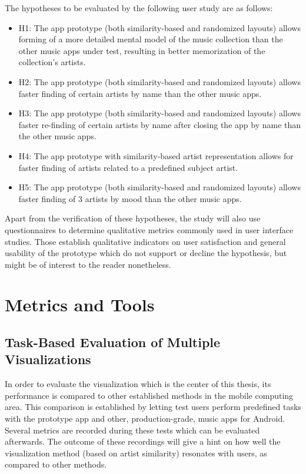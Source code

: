 The hypotheses to be evaluated by the following user study are as follows:

\begin{itemize}
	\item H1: The app prototype (both similarity-based and randomized layouts) allows forming of a more detailed mental model of the music collection than the other music apps under test, resulting in better memorization of the collection's artists.
	\item H2: The app prototype (both similarity-based and randomized layouts) allows faster finding of certain artists by name than the other music apps.
	\item H3: The app prototype (both similarity-based and randomized layouts) allows faster re-finding of certain artists by name after closing the app by name than the other music apps.
	\item H4: The app prototype with similarity-based artist representation allows for faster finding of artists related to a predefined subject artist.
	\item H5: The app prototype (both similarity-based and randomized layouts) allows faster finding of 3 artists by mood than the other music apps.
\end{itemize}

Apart from the verification of these hypotheses, the study will also use questionnaires to determine qualitative metrics commonly used in user interface studies. Those establish qualitative indicators on user satisfaction and general usability of the prototype which do not support or decline the hypothesis, but might be of interest to the reader nonetheless.

\section{Metrics and Tools}

\subsection{Task-Based Evaluation of Multiple Visualizations}

In order to evaluate the visualization which is the center of this thesis, its performance is compared to other established methods in the mobile computing area. This comparison is established by letting test users perform predefined tasks with the prototype app and other, production-grade, music apps for Android. Several metrics are recorded during these tests which can be evaluated afterwards. The outcome of these recordings will give a hint on how well the visualization method (based on artist similarity) resonates with users, as compared to other methods.

